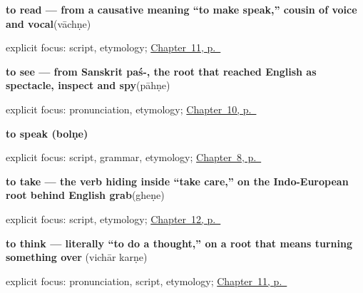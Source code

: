 \noindent\begin{minipage}[t]{\linewidth}
\raggedright
\textbf{to read — from a causative meaning \textquotedblleft{}to make speak,\textquotedblright{} cousin of voice and vocal}\enspace\emph{}\enspace(vāchṇe)\par
\footnotesize explicit focus: script, etymology; \hyperref[ch:mr-mind-and-page]{Chapter~11, p.~\pageref*{ch:mr-mind-and-page}}
\end{minipage}\par\smallskip

\noindent\begin{minipage}[t]{\linewidth}
\raggedright
\textbf{to see — from Sanskrit paś-, the root that reached English as spectacle, inspect and spy}\enspace\emph{}\enspace(pāhṇe)\par
\footnotesize explicit focus: pronunciation, etymology; \hyperref[ch:mr-core-verbs]{Chapter~10, p.~\pageref*{ch:mr-core-verbs}}
\end{minipage}\par\smallskip

\noindent\begin{minipage}[t]{\linewidth}
\raggedright
\textbf{to speak (bolṇe)}\enspace\emph{}\par
\footnotesize explicit focus: script, grammar, etymology; \hyperref[ch:first-verbs]{Chapter~8, p.~\pageref*{ch:first-verbs}}
\end{minipage}\par\smallskip

\noindent\begin{minipage}[t]{\linewidth}
\raggedright
\textbf{to take — the verb hiding inside \textquotedblleft{}take care,\textquotedblright{} on the Indo-European root behind English grab}\enspace\emph{}\enspace(gheṇe)\par
\footnotesize explicit focus: script, etymology; \hyperref[ch:mr-doing-verbs]{Chapter~12, p.~\pageref*{ch:mr-doing-verbs}}
\end{minipage}\par\smallskip

\noindent\begin{minipage}[t]{\linewidth}
\raggedright
\textbf{to think — literally \textquotedblleft{}to do a thought,\textquotedblright{} on a root that means turning something over}\enspace\emph{ }\enspace(vichār karṇe)\par
\footnotesize explicit focus: pronunciation, script, etymology; \hyperref[ch:mr-mind-and-page]{Chapter~11, p.~\pageref*{ch:mr-mind-and-page}}
\end{minipage}\par\smallskip

